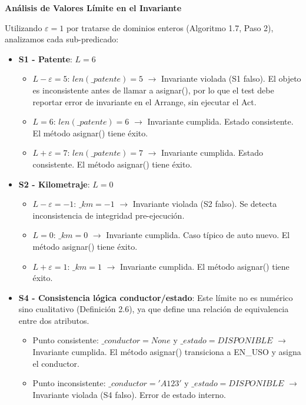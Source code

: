 \textbf{Análisis de Valores Límite en el Invariante}

Utilizando $\varepsilon = 1$ por tratarse de dominios enteros (Algoritmo 1.7, Paso 2), analizamos cada sub-predicado:

\begin{itemize}
    \item \textbf{S1 - Patente}: $L = 6$
    \begin{itemize}
        \item $L - \varepsilon = 5$: $len(\_patente) = 5$ $\rightarrow$ Invariante violada (S1 falso). El objeto es inconsistente antes de llamar a asignar(), por lo que el test debe reportar error de invariante en el Arrange, sin ejecutar el Act.
        \item $L = 6$: $len(\_patente) = 6$ $\rightarrow$ Invariante cumplida. Estado consistente. El método asignar() tiene éxito.
        \item $L + \varepsilon = 7$: $len(\_patente) = 7$ $\rightarrow$ Invariante cumplida. Estado consistente. El método asignar() tiene éxito.
    \end{itemize}

    \item \textbf{S2 - Kilometraje}: $L = 0$
    \begin{itemize}
        \item $L - \varepsilon = -1$: $\_km = -1$ $\rightarrow$ Invariante violada (S2 falso). Se detecta inconsistencia de integridad pre-ejecución.
        \item $L = 0$: $\_km = 0$ $\rightarrow$ Invariante cumplida. Caso típico de auto nuevo. El método asignar() tiene éxito.
        \item $L + \varepsilon = 1$: $\_km = 1$ $\rightarrow$ Invariante cumplida. El método asignar() tiene éxito.
    \end{itemize}

    \item \textbf{S4 - Consistencia lógica conductor/estado}: Este límite no es numérico sino cualitativo (Definición 2.6), ya que define una relación de equivalencia entre dos atributos.
    \begin{itemize}
        \item Punto consistente: $\_conductor = None$ y $\_estado = DISPONIBLE$ $\rightarrow$ Invariante cumplida. El método asignar() transiciona a EN\_USO y asigna el conductor.
        \item Punto inconsistente: $\_conductor = 'A123'$ y $\_estado = DISPONIBLE$ $\rightarrow$ Invariante violada (S4 falso). Error de estado interno.
    \end{itemize}
\end{itemize}

